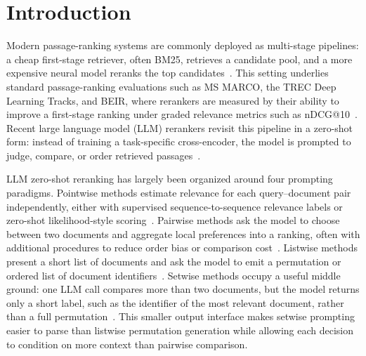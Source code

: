 \section{Introduction}
\label{sec:introduction}

Modern passage-ranking systems are commonly deployed as multi-stage
pipelines: a cheap first-stage retriever, often BM25, retrieves a
candidate pool, and a more expensive neural model reranks the top
candidates~\citep{robertson2009probabilistic,
nogueira2019passage,nogueira2020monot5,yates2021pretrained}.
This setting underlies standard passage-ranking evaluations such as
MS MARCO, the TREC Deep Learning Tracks, and BEIR, where rerankers are
measured by their ability to improve a first-stage ranking under graded
relevance metrics such as nDCG@10~\citep{bajaj2016msmarco,
craswell2020trecDL,craswell2021trecDL,thakur2021beir,
jarvelin2002cumulated}. Recent large language model (LLM) rerankers
revisit this pipeline in a zero-shot form: instead of training a
task-specific cross-encoder, the model is prompted to judge, compare, or
order retrieved passages~\citep{sachan2022upr,sun2023rankgpt,
ma2023zeroshotlistwise,qin2024prp,zhuang2024setwise,
pradeep2023rankvicuna,pradeep2023rankzephyr}.

LLM zero-shot reranking has largely been organized around four prompting
paradigms. Pointwise methods estimate relevance for each query--document
pair independently, either with supervised sequence-to-sequence relevance
labels or zero-shot likelihood-style scoring~\citep{nogueira2020monot5,
sachan2022upr}. Pairwise methods ask the model to choose between two
documents and aggregate local preferences into a ranking, often with
additional procedures to reduce order bias or comparison
cost~\citep{pradeep2021expandomonoduo,qin2024prp}. Listwise methods
present a short list of documents and ask the model to emit a permutation
or ordered list of document identifiers~\citep{ma2023zeroshotlistwise,
sun2023rankgpt,pradeep2023rankvicuna,pradeep2023rankzephyr,
yoon2024listt5}. Setwise methods occupy a useful middle ground: one LLM
call compares more than two documents, but the model returns only a short
label, such as the identifier of the most relevant document, rather than
a full permutation~\citep{zhuang2024setwise}. This smaller output
interface makes setwise prompting easier to parse than listwise
permutation generation while allowing each decision to condition on more
context than pairwise comparison.

